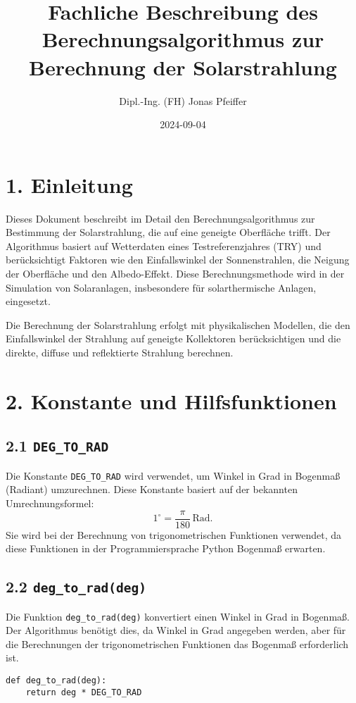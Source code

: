 \documentclass{article}
\title{Fachliche Beschreibung des Berechnungsalgorithmus zur Berechnung der Solarstrahlung}
\author{Dipl.-Ing. (FH) Jonas Pfeiffer}
\date{2024-09-04}
\begin{document}
\maketitle

\section*{1. Einleitung}

Dieses Dokument beschreibt im Detail den Berechnungsalgorithmus zur Bestimmung der Solarstrahlung, die auf eine geneigte Oberfläche trifft. Der Algorithmus basiert auf Wetterdaten eines Testreferenzjahres (TRY) und berücksichtigt Faktoren wie den Einfallswinkel der Sonnenstrahlen, die Neigung der Oberfläche und den Albedo-Effekt. Diese Berechnungsmethode wird in der Simulation von Solaranlagen, insbesondere für solarthermische Anlagen, eingesetzt.

Die Berechnung der Solarstrahlung erfolgt mit physikalischen Modellen, die den Einfallswinkel der Strahlung auf geneigte Kollektoren berücksichtigen und die direkte, diffuse und reflektierte Strahlung berechnen.

\section*{2. Konstante und Hilfsfunktionen}

\subsection*{2.1 \texttt{DEG\_TO\_RAD}}

Die Konstante \texttt{DEG\_TO\_RAD} wird verwendet, um Winkel in Grad in Bogenmaß (Radiant) umzurechnen. Diese Konstante basiert auf der bekannten Umrechnungsformel:
\[
1^\circ = \frac{\pi}{180} \, \text{Rad}.
\]
Sie wird bei der Berechnung von trigonometrischen Funktionen verwendet, da diese Funktionen in der Programmiersprache Python Bogenmaß erwarten.

\subsection*{2.2 \texttt{deg\_to\_rad(deg)}}

Die Funktion \texttt{deg\_to\_rad(deg)} konvertiert einen Winkel in Grad in Bogenmaß. Der Algorithmus benötigt dies, da Winkel in Grad angegeben werden, aber für die Berechnungen der trigonometrischen Funktionen das Bogenmaß erforderlich ist.

\begin{verbatim}
def deg_to_rad(deg):
    return deg * DEG_TO_RAD
\end{verbatim}
\end{document}
